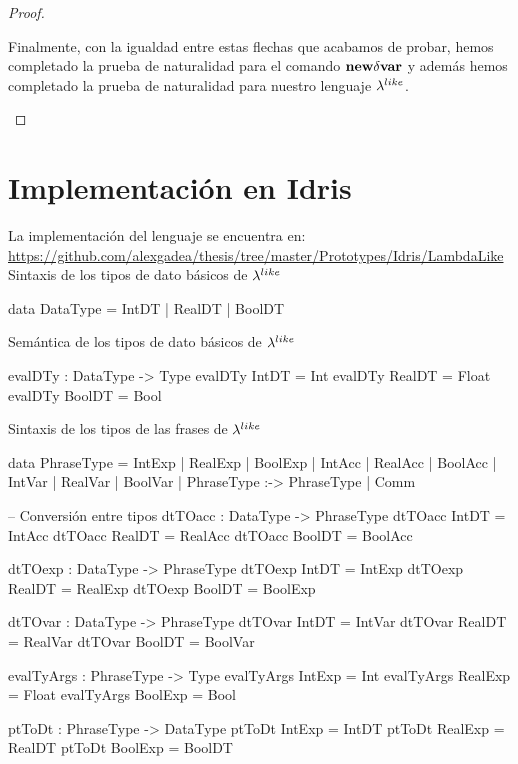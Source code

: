 \begin{proof}
\begin{itemize}
\begin{itemize}
\begin{itemize}
Finalmente, con la igualdad entre estas flechas que acabamos de probar, hemos completado
la prueba de naturalidad para el comando $\textbf{new} \delta \textbf{var}$ y adem\'as hemos completado
la prueba de naturalidad para nuestro lenguaje $\lambda^{like}$.
\end{itemize}
\end{itemize}
\end{itemize}
\end{proof}

\section{Implementaci\'on en Idris}

La implementaci\'on del lenguaje se encuentra en:\\
\url{https://github.com/alexgadea/thesis/tree/master/Prototypes/Idris/LambdaLike}\\

\noindent
Sintaxis de los tipos de dato b\'asicos de $\lambda^{like}$

\begin{code}
data DataType = IntDT | RealDT | BoolDT
\end{code}

\noindent Sem\'antica de los tipos de dato b\'asicos de $\lambda^{like}$

\begin{code}
evalDTy : DataType -> Type
evalDTy IntDT  = Int
evalDTy RealDT = Float
evalDTy BoolDT = Bool
\end{code}

\noindent Sintaxis de los tipos de las frases de $\lambda^{like}$
\begin{code}
data PhraseType = IntExp | RealExp | BoolExp 
                | IntAcc | RealAcc | BoolAcc
                | IntVar | RealVar | BoolVar
                | PhraseType :-> PhraseType
                | Comm

-- Conversión entre tipos
dtTOacc : DataType -> PhraseType
dtTOacc IntDT  = IntAcc
dtTOacc RealDT = RealAcc
dtTOacc BoolDT = BoolAcc

dtTOexp : DataType -> PhraseType
dtTOexp IntDT  = IntExp
dtTOexp RealDT = RealExp
dtTOexp BoolDT = BoolExp

dtTOvar : DataType -> PhraseType
dtTOvar IntDT  = IntVar
dtTOvar RealDT = RealVar
dtTOvar BoolDT = BoolVar

evalTyArgs : PhraseType -> Type
evalTyArgs IntExp  = Int
evalTyArgs RealExp = Float
evalTyArgs BoolExp = Bool

ptToDt : PhraseType -> DataType
ptToDt IntExp  = IntDT
ptToDt RealExp = RealDT
ptToDt BoolExp = BoolDT

\end{code}

